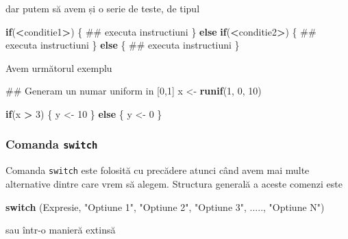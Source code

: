 \documentclass[]{article}
\newenvironment{Shaded}{\begin{snugshade}}{\end{snugshade}}
\newcommand{\KeywordTok}[1]{\textcolor[rgb]{0.13,0.29,0.53}{\textbf{#1}}}
\newcommand{\DecValTok}[1]{\textcolor[rgb]{0.00,0.00,0.81}{#1}}
\newcommand{\StringTok}[1]{\textcolor[rgb]{0.31,0.60,0.02}{#1}}
\newcommand{\ControlFlowTok}[1]{\textcolor[rgb]{0.13,0.29,0.53}{\textbf{#1}}}
\newcommand{\OperatorTok}[1]{\textcolor[rgb]{0.81,0.36,0.00}{\textbf{#1}}}
\newcommand{\NormalTok}[1]{#1}
\newcounter{exo}[section]
\begin{document}
dar putem să avem și o serie de teste, de tipul

\begin{Shaded}
\begin{Highlighting}[]
\ControlFlowTok{if}\NormalTok{(}\OperatorTok{<}\NormalTok{conditie1}\OperatorTok{>}\NormalTok{) \{}
\NormalTok{        ## executa instructiuni}
\NormalTok{\} }\ControlFlowTok{else} \ControlFlowTok{if}\NormalTok{(}\OperatorTok{<}\NormalTok{conditie2}\OperatorTok{>}\NormalTok{)  \{}
\NormalTok{        ## executa instructiuni}
\NormalTok{\} }\ControlFlowTok{else}\NormalTok{ \{}
\NormalTok{        ## executa instructiuni}
\NormalTok{\}}
\end{Highlighting}
\end{Shaded}

Avem următorul exemplu

\begin{Shaded}
\begin{Highlighting}[]
\NormalTok{## Generam un numar uniform in [0,1]}
\NormalTok{x <-}\StringTok{ }\KeywordTok{runif}\NormalTok{(}\DecValTok{1}\NormalTok{, }\DecValTok{0}\NormalTok{, }\DecValTok{10}\NormalTok{)  }

\ControlFlowTok{if}\NormalTok{(x }\OperatorTok{>}\StringTok{ }\DecValTok{3}\NormalTok{) \{}
\NormalTok{        y <-}\StringTok{ }\DecValTok{10}
\NormalTok{\} }\ControlFlowTok{else}\NormalTok{ \{}
\NormalTok{        y <-}\StringTok{ }\DecValTok{0}
\NormalTok{\}}
\end{Highlighting}
\end{Shaded}

\subsubsection{\texorpdfstring{Comanda
\texttt{switch}}{Comanda switch}}\label{comanda-switch}

Comanda \texttt{switch} este folosită cu precădere atunci când avem mai
multe alternative dintre care vrem să alegem. Structura generală a
aceste comenzi este

\begin{Shaded}
\begin{Highlighting}[]
\ControlFlowTok{switch}\NormalTok{ (Expresie, }\StringTok{"Optiune 1"}\NormalTok{, }\StringTok{"Optiune 2"}\NormalTok{, }\StringTok{"Optiune 3"}\NormalTok{, ....., }\StringTok{"Optiune N"}\NormalTok{)}
\end{Highlighting}
\end{Shaded}

sau într-o manieră extinsă
\end{document}

